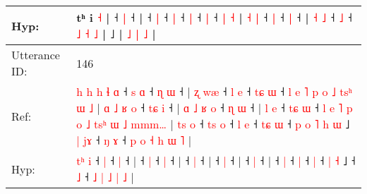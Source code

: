 \documentclass[10pt]{article}
\DeclareRobustCommand{\hl}[1]{{\textcolor{red}{#1}}}
\begin{document}
\begin{longtable}{ll}
 \\
Hyp: & \hl{}\hl{}\hl{}\hl{}\hl{}\hl{}\hl{}\hl{}\hl{}\hl{}\hl{}\hl{}\hl{}\hl{}\hl{}\hl{}\hl{}\hl{}\hl{}\hl{}\hl{}\hl{}\hl{}\hl{}\hl{}\hl{}\hl{}\hl{}\hl{}\hl{}\hl{}\hl{}\hl{}\hl{}\hl{}\hl{}\hl{}\hl{}\hl{}\hl{}\hl{}\hl{}\hl{}\hl{}\hl{}\hl{}\hl{}\hl{}\hl{}\hl{}\hl{}\hl{}\hl{}\hl{}\hl{}\hl{}\hl{}\hl{}\hl{}\hl{}\hl{}tʰ i \hl{}\hl{˧} |\hl{}\hl{}\hl{}\hl{}\hl{} ˧\hl{}\hl{} \hl{|} ˧ |\hl{}\hl{}\hl{}\hl{}\hl{} ˧\hl{}\hl{} \hl{}\hl{|} ˧\hl{}\hl{} \hl{|} ˧\hl{}\hl{}\hl{}\hl{}\hl{}\hl{} \hl{|} ˧\hl{}\hl{} \hl{|} ˧\hl{}\hl{}\hl{}\hl{}\hl{}\hl{}\hl{}\hl{}\hl{}\hl{}\hl{}\hl{}\hl{}\hl{}\hl{} \hl{|} \hl{˧} | \hl{˧} \hl{}\hl{|} ˧\hl{}\hl{} \hl{|} ˧\hl{}\hl{} \hl{|} ˧ | \hl{}\hl{}\hl{˧} \hl{˩} ˧\hl{}\hl{} \hl{˩} ˧ \hl{˩} \hl{˧} \hl{˩} |\hl{}\hl{}\hl{}\hl{}\hl{} ˩\hl{} | \hl{˩} \hl{|} \hl{˩} |
 \\
\midrule
Utterance ID: & 146 \\
Ref: & \hl{h}\hl{ }\hl{h}\hl{ }\hl{h}\hl{ }\hl{ɬ} \hl{ɑ} ˧\hl{ }\hl{s} \hl{ɑ} ˧\hl{ }\hl{ɳ} \hl{ɯ} ˧ |\hl{ }\hl{ʐ}\hl{ }\hl{w}\hl{æ} ˧\hl{ }\hl{l} \hl{e} ˧\hl{ }\hl{t}\hl{ɕ} \hl{ɯ} ˧\hl{ }\hl{l}\hl{ }\hl{e}\hl{ }\hl{˥}\hl{ }\hl{p}\hl{ }\hl{o}\hl{ }\hl{˩}\hl{ }\hl{t}\hl{s}\hl{ʰ}\hl{ }\hl{ɯ}\hl{ }\hl{˩} |\hl{ }\hl{ɑ}\hl{ }\hl{˩}\hl{ }\hl{ʁ}\hl{ }\hl{o} ˧\hl{ }\hl{t}\hl{ɕ} \hl{i} ˧ |\hl{ }\hl{ɑ}\hl{ }\hl{˩}\hl{ }\hl{ʁ}\hl{ }\hl{o} ˧\hl{ }\hl{ɳ} \hl{ɯ} ˧ |\hl{ }\hl{l}\hl{ }\hl{e} ˧\hl{ }\hl{t}\hl{ɕ} \hl{ɯ} ˧\hl{ }\hl{l}\hl{ }\hl{e}\hl{ }\hl{˥}\hl{ }\hl{p}\hl{ }\hl{o}\hl{ }\hl{˩}\hl{ }\hl{t}\hl{s}\hl{ʰ}\hl{ }\hl{ɯ}\hl{ }\hl{˩}\hl{ }\hl{m}\hl{m}\hl{m}\hl{…} |\hl{ }\hl{t}\hl{s}\hl{ }\hl{o} ˧\hl{ }\hl{t}\hl{s} \hl{o} ˧\hl{ }\hl{l} \hl{e} ˧\hl{ }\hl{t}\hl{ɕ} \hl{ɯ} ˧\hl{ }\hl{p}\hl{ }\hl{o}\hl{ }\hl{˥} \hl{h} \hl{ɯ} ˩\hl{ }\hl{|}\hl{ }\hl{j}\hl{ɤ} ˧\hl{ }\hl{ŋ} \hl{ɤ} ˧\hl{ }\hl{p} \hl{o} \hl{˧} \hl{h} \hl{ɯ} \hl{˥} |
 \\
Hyp: & \hl{}\hl{}\hl{}\hl{}\hl{}\hl{t}\hl{ʰ} \hl{i} ˧\hl{}\hl{} \hl{|} ˧\hl{}\hl{} \hl{|} ˧ |\hl{}\hl{}\hl{}\hl{}\hl{} ˧\hl{}\hl{} \hl{|} ˧\hl{}\hl{}\hl{} \hl{|} ˧\hl{}\hl{}\hl{}\hl{}\hl{}\hl{}\hl{}\hl{}\hl{}\hl{}\hl{}\hl{}\hl{}\hl{}\hl{}\hl{}\hl{}\hl{}\hl{}\hl{} |\hl{}\hl{}\hl{}\hl{}\hl{}\hl{}\hl{}\hl{} ˧\hl{}\hl{}\hl{} \hl{|} ˧ |\hl{}\hl{}\hl{}\hl{}\hl{}\hl{}\hl{}\hl{} ˧\hl{}\hl{} \hl{|} ˧ |\hl{}\hl{}\hl{}\hl{} ˧\hl{}\hl{}\hl{} \hl{|} ˧\hl{}\hl{}\hl{}\hl{}\hl{}\hl{}\hl{}\hl{}\hl{}\hl{}\hl{}\hl{}\hl{}\hl{}\hl{}\hl{}\hl{}\hl{}\hl{}\hl{}\hl{}\hl{}\hl{}\hl{}\hl{} |\hl{}\hl{}\hl{}\hl{}\hl{} ˧\hl{}\hl{}\hl{} \hl{|} ˧\hl{}\hl{} \hl{|} ˧\hl{}\hl{}\hl{} \hl{|} ˧\hl{}\hl{}\hl{}\hl{}\hl{}\hl{} \hl{|} \hl{˧} ˩\hl{}\hl{}\hl{}\hl{}\hl{} ˧\hl{}\hl{} \hl{˩} ˧\hl{}\hl{} \hl{˩} \hl{|} \hl{˩} \hl{|} \hl{˩} |

\end{longtable}
\end{document}
